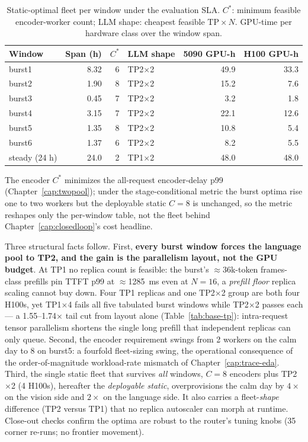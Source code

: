 \begin{table}[htbp]
\centering
\caption{Static-optimal fleet per window under the evaluation SLA.
$C^{*}$: minimum feasible encoder-worker count; LLM shape: cheapest
feasible $\mathrm{TP}\times N$. GPU-time per hardware class over the
window span.}
\label{tab:base-grid}
\small
\begin{tabular}{@{}lrrlrr@{}}
\toprule
Window & Span (h) & $C^{*}$ & LLM shape & 5090 GPU-h & H100 GPU-h \\
\midrule
burst1 & 8.32 & 6 & TP2$\times$2 & 49.9 & 33.3 \\
burst2 & 1.90 & 8 & TP2$\times$2 & 15.2 & 7.6 \\
burst3 & 0.45 & 7 & TP2$\times$2 & 3.2 & 1.8 \\
burst4 & 3.15 & 7 & TP2$\times$2 & 22.1 & 12.6 \\
burst5 & 1.35 & 8 & TP2$\times$2 & 10.8 & 5.4 \\
burst6 & 1.37 & 6 & TP2$\times$2 & 8.2 & 5.5 \\
steady (24 h) & 24.0 & 2 & TP1$\times$2 & 48.0 & 48.0 \\
\bottomrule
\end{tabular}
\end{table}

The encoder $C^{*}$ minimizes the all-request encoder-delay p99
(Chapter~\ref{cap:twopool}); under the stage-conditional metric the
burst optima rise one to two workers but the deployable static $C{=}8$
is unchanged, so the metric reshapes only the per-window table, not the
fleet behind Chapter~\ref{cap:closedloop}'s cost headline.

Three structural facts follow. First, \textbf{every burst window forces
the language pool to TP2, and the gain is the parallelism layout, not
the GPU budget}. At TP1 no replica count is feasible: the burst's
${\approx}36$k-token frames-class prefills pin TTFT p99 at
${\approx}$\SI{1285}{\milli\second} even at $N{=}16$, a \emph{prefill
floor} replica scaling cannot buy down. Four TP1 replicas and one
TP2$\times$2 group are both four H100s, yet TP1$\times$4 fails all five
tabulated burst windows while TP2$\times$2 passes each --- a
1.55--1.74$\times$
tail cut from layout alone (Table~\ref{tab:base-tp}): intra-request
tensor parallelism shortens the single long prefill that independent
replicas can only queue. Second, the encoder requirement
swings from 2 workers on the calm day to 8 on burst5: a fourfold
fleet-sizing swing, the operational consequence of the
order-of-magnitude workload-rate mismatch of Chapter~\ref{cap:trace-eda}. Third, the single static fleet that survives
\emph{all} windows, $C{=}8$ encoders plus TP2$\times$2 (4 H100s),
hereafter the \emph{deployable static}, overprovisions the calm
day by $4\times$ on the vision side and $2\times$ on the language side.
It also carries a fleet-\emph{shape} difference (TP2 versus TP1) that no
replica autoscaler can morph at runtime. Close-out checks confirm the
optima are robust to the router's tuning knobs (35 corner re-runs;
no frontier movement).

